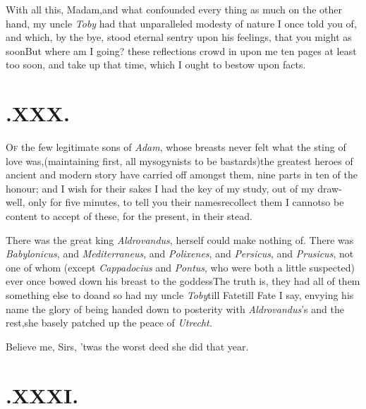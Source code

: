 \documentclass{article}
\begin{document}
\enlargethispage\baselineskip
With all this, Madam,\tsk and what confounded every thing as
much on the other hand, my uncle \textit{Toby} had that unparalleled
modesty of nature I once told you of, and which, by the bye, stood
eternal sentry upon his feelings, that you might as soon\tsh But where am I going?
these reflections crowd in upon me ten pages at least too soon, and
take up that time, which I ought to bestow upon facts.

\newpage
\null\smallskip

\section{.\enspace XXX.}

\lettrine{O}{f} the few legitimate sons of
\textit{Adam}, whose breasts never felt what the sting of love
was,\tsk (maintaining first, all mysogynists to be
bastards)\tsk the greatest heroes of ancient and modern story
have carried off amongst them, nine parts in ten of the honour; and
I wish for their sakes I had the key of my study, out of my
draw-well, only for five minutes, to tell you their
names\tsk recollect them I cannot\tsk so be content to accept
of these, for the present, in their stead.\tsh

There was the great king \textit{Aldrovandus},\break
{}
\break
herself could make nothing of.\tsh\pb
There
was \textit{Babylonicus}, and \textit{Mediterraneus}, and
\textit{Polixenes}, and \textit{Persicus}, and \textit{Prusicus}, not one
of whom (except \textit{Cappadocius} and \textit{Pontus}, who were both
a little suspected) ever once bowed down his breast to the
goddess\tsh The truth is, they had all of them something
else to do\tsk and so had my uncle \textit{Toby}\tsk till
Fate\tsk till Fate I say, envying his name the glory of being
handed down to posterity with \textit{Aldrovandus}’s and the
rest,\tsk she basely patched up the peace of \textit{Utrecht.}

\tsh Believe me, Sirs, ’twas the worst deed she
did that year.

\setlength{\baselineskip}{12.7826pt}
\section{.\enspace XXXI.}
\end{document}
